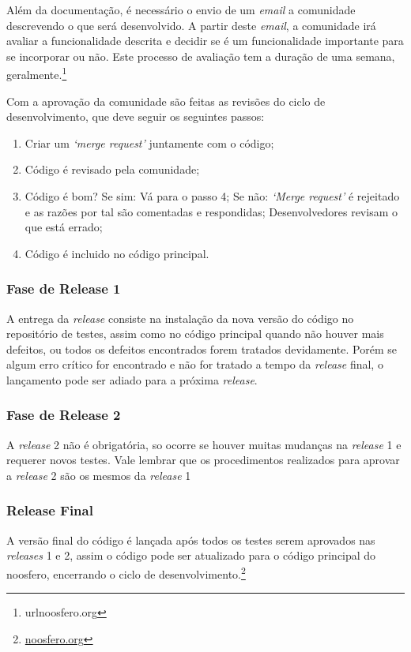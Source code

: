 
Além da documentação, é necessário o envio de um \textit{email} a comunidade descrevendo o 
que será desenvolvido. A partir deste \textit{email}, a comunidade irá avaliar a funcionalidade 
descrita e decidir se é um funcionalidade importante para se incorporar ou não. 
Este processo de avaliação tem a duração de uma semana, geralmente.\footnote{url{noosfero.org}}

Com a aprovação da comunidade são feitas as revisões do ciclo de desenvolvimento, 
que deve seguir os seguintes passos:
%
\begin{enumerate}
\item Criar um \textit{‘merge request’} juntamente com o código;
\item Código é revisado pela comunidade;
\item Código é bom? 
\subitem Se sim:
\subsubitem Vá para o passo 4;
\subitem Se não:
\subsubitem \textit{‘Merge request’} é rejeitado e as razões por tal são comentadas e 
respondidas;
\subsubitem Desenvolvedores revisam o que está errado;
\item Código é incluido no código principal.
\end{enumerate}
\subsubsection{Fase de Release 1}
%
A entrega da \textit{release} consiste na instalação da nova versão do código no repositório de testes, assim como no código principal quando não houver mais defeitos, ou todos os defeitos encontrados forem tratados devidamente. Porém se algum erro crítico for encontrado e não for tratado a tempo da \textit{release} final, o lançamento pode ser adiado para a próxima \textit{release}.
%
\subsubsection{Fase de Release 2}
%
A \textit{release} 2 não é obrigatória, so ocorre se houver muitas mudanças na \textit{release} 1 e requerer novos testes. Vale lembrar que os procedimentos realizados para aprovar a \textit{release} 2 são os mesmos da \textit{release} 1%
%
\subsubsection{Release Final}
%
A versão final do código é lançada após todos os testes serem aprovados nas \textit{releases} 1 e 2, assim o código pode ser atualizado para o código principal do noosfero, encerrando o ciclo de desenvolvimento.\footnote{\url{noosfero.org}}

